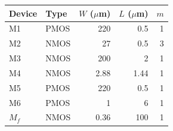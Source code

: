 \begin{tabular}{llrrr}
\toprule
Device & Type & $W$ ($\mu$m) & $L$ ($\mu$m) & $m$ \\
\midrule
M1 & PMOS & 220 & 0.5 & 1 \\
M2 & NMOS & 27 & 0.5 & 3 \\
M3 & NMOS & 200 & 2 & 1 \\
M4 & NMOS & 2.88 & 1.44 & 1 \\
M5 & PMOS & 220 & 0.5 & 1 \\
M6 & PMOS & 1 & 6 & 1 \\
$M_f$ & NMOS & 0.36 & 100 & 1 \\
\bottomrule
\end{tabular}
